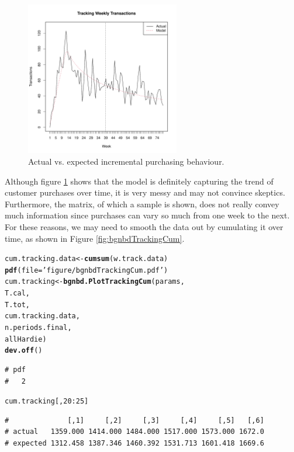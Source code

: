 \documentclass[10pt, letterpaper, onecolumn, oneside, final]{article}\usepackage[]{graphicx}\usepackage[]{color}
\makeatletter
\newcommand{\hlnum}[1]{\textcolor[rgb]{0.686,0.059,0.569}{#1}}%
\newcommand{\hlstr}[1]{\textcolor[rgb]{0.192,0.494,0.8}{#1}}%
\newcommand{\hlopt}[1]{\textcolor[rgb]{0,0,0}{#1}}%
\newcommand{\hlstd}[1]{\textcolor[rgb]{0.345,0.345,0.345}{#1}}%
\newcommand{\hlkwb}[1]{\textcolor[rgb]{0.69,0.353,0.396}{#1}}%
\newcommand{\hlkwc}[1]{\textcolor[rgb]{0.333,0.667,0.333}{#1}}%
\newcommand{\hlkwd}[1]{\textcolor[rgb]{0.737,0.353,0.396}{\textbf{#1}}}%
\newenvironment{kframe}{%
 \def\at@end@of@kframe{}%
 \ifinner\ifhmode%
  \def\at@end@of@kframe{\end{minipage}}%
  \begin{minipage}{\columnwidth}%
 \fi\fi%
 \def\FrameCommand##1{\hskip\@totalleftmargin \hskip-\fboxsep
 \colorbox{shadecolor}{##1}\hskip-\fboxsep
     \hskip-\linewidth \hskip-\@totalleftmargin \hskip\columnwidth}%
 \MakeFramed {\advance\hsize-\width
   \@totalleftmargin\z@ \linewidth\hsize
   \@setminipage}}%
 {\par\unskip\endMakeFramed%
 \at@end@of@kframe}
\newenvironment{knitrout}{}{} %
\makeatother
\begin{document}
\begin{figure}
  \begin{center}
  \includegraphics[width=0.6\textwidth]{figure/bgnbdTrackingInc}
  \caption{Actual vs. expected incremental purchasing behaviour.}\label{fig:bgnbdTrackingInc}
  \end{center}
\end{figure}

Although figure \ref{fig:bgnbdTrackingInc} shows that the model is
definitely capturing the trend of customer purchases over time, it is
very messy and may not convince skeptics. Furthermore, the matrix, of
which a sample is shown, does not really convey much information since
purchases can vary so much from one week to the next. For these
reasons, we may need to smooth the data out by cumulating it over
time, as shown in Figure \ref{fig:bgnbdTrackingCum}.

\begin{knitrout}
\color{fgcolor}\begin{kframe}
\begin{alltt}
\hlstd{cum.tracking.data} \hlkwb{<-} \hlkwd{cumsum}\hlstd{(w.track.data)}
\hlkwd{pdf}\hlstd{(}\hlkwc{file} \hlstd{=} \hlstr{'figure/bgnbdTrackingCum.pdf'}\hlstd{)}
\hlstd{cum.tracking} \hlkwb{<-} \hlkwd{bgnbd.PlotTrackingCum}\hlstd{(params,}
                                      \hlstd{T.cal,}
                                      \hlstd{T.tot,}
                                      \hlstd{cum.tracking.data,}
                                      \hlstd{n.periods.final,}
                                      \hlstd{allHardie)}
\hlkwd{dev.off}\hlstd{()}
\end{alltt}
\begin{verbatim}
# pdf 
#   2
\end{verbatim}
\begin{alltt}
\hlstd{cum.tracking[,}\hlnum{20}\hlopt{:}\hlnum{25}\hlstd{]}
\end{alltt}
\begin{verbatim}
#              [,1]     [,2]     [,3]     [,4]     [,5]   [,6]
# actual   1359.000 1414.000 1484.000 1517.000 1573.000 1672.0
# expected 1312.458 1387.346 1460.392 1531.713 1601.418 1669.6
\end{verbatim}
\end{kframe}
\end{knitrout}
\end{document}
